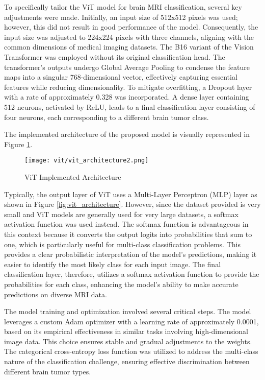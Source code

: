 To specifically tailor the ViT model for brain MRI classification, several key adjustments were made. Initially, an input size of 512x512 pixels was used; however, this did not result in good performance of the model. Consequently, the input size was adjusted to 224x224 pixels with three channels, aligning with the common dimensions of medical imaging datasets. The B16 variant of the Vision Transformer was employed without its original classification head. The transformer's outputs undergo Global Average Pooling to condense the feature maps into a singular 768-dimensional vector, effectively capturing essential features while reducing dimensionality. To mitigate overfitting, a Dropout layer with a rate of approximately 0.328 was incorporated. A dense layer containing 512 neurons, activated by ReLU, leads to a final classification layer consisting of four neurons, each corresponding to a different brain tumor class. 

The implemented architecture of the proposed model is visually represented in Figure \ref{fig:vit_implemented_architecture}. 


\begin{figure}[H]
  \centering
  \texttt{[image: vit/vit\_architecture2.png]}
  \caption{ViT Implemented Architecture}
  \label{fig:vit_implemented_architecture}
\end{figure}

Typically, the output layer of ViT uses a Multi-Layer Perceptron (MLP) layer as shown in Figure \ref{fig:vit_architecture}. However, since the dataset provided is very small and ViT models are generally used for very large datasets, a softmax activation function was used instead. The softmax function is advantageous in this context because it converts the output logits into probabilities that sum to one, which is particularly useful for multi-class classification problems. This provides a clear probabilistic interpretation of the model's predictions, making it easier to identify the most likely class for each input image. The final classification layer, therefore, utilizes a softmax activation function to provide the probabilities for each class, enhancing the model's ability to make accurate predictions on diverse MRI data.



The model training and optimization involved several critical steps. The model leverages a custom Adam optimizer with a learning rate of approximately 0.0001, based on its empirical effectiveness in similar tasks involving high-dimensional image data. This choice ensures stable and gradual adjustments to the weights. The categorical cross-entropy loss function was utilized to address the multi-class nature of the classification challenge, ensuring effective discrimination between different brain tumor types. 

